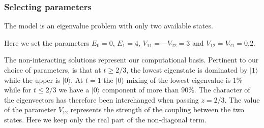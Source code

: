 \documentclass{beamer}
\begin{document}
\begin{frame}
\frametitle{Selecting parameters}

The model is an eigenvalue problem with only
two available states.

Here we set the parameters $E_0=0$,
$E_1=4$, $V_{11}=-V_{22}=3$ and $V_{12}=V_{21}=0.2$.

The non-interacting solutions represent our computational basis.
Pertinent to our choice of parameters, is that at $t\geq 2/3$,
the lowest eigenstate is dominated by $\vert 1\rangle$ while the upper
is $\vert 0 \rangle$. At $t=1$ the $\vert 0 \rangle$ mixing of
the lowest eigenvalue is $1\%$ while for $t\leq 2/3$ we have a
$\vert 0 \rangle$ component of more than $90\%$.  The character of the
eigenvectors has therefore been interchanged when passing $z=2/3$. The
value of the parameter $V_{12}$ represents the strength of the coupling
between the two states.  Here we keep only the real part of the non-diagonal term.
\end{frame}
\end{document}
